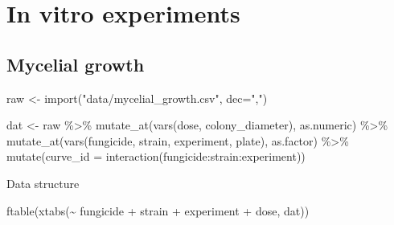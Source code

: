 \documentclass[
  letterpaper,
  DIV=11,
  numbers=noendperiod]{scrreport}
\newenvironment{Shaded}{\begin{snugshade}}{\end{snugshade}}
\newcommand{\AttributeTok}[1]{\textcolor[rgb]{0.40,0.45,0.13}{#1}}
\newcommand{\FunctionTok}[1]{\textcolor[rgb]{0.28,0.35,0.67}{#1}}
\newcommand{\NormalTok}[1]{\textcolor[rgb]{0.00,0.23,0.31}{#1}}
\newcommand{\OtherTok}[1]{\textcolor[rgb]{0.00,0.23,0.31}{#1}}
\newcommand{\SpecialCharTok}[1]{\textcolor[rgb]{0.37,0.37,0.37}{#1}}
\newcommand{\StringTok}[1]{\textcolor[rgb]{0.13,0.47,0.30}{#1}}
\begin{document}

\hypertarget{in-vitro-experiments}{%
\chapter{In vitro experiments}\label{in-vitro-experiments}}

\hypertarget{mycelial-growth}{%
\section{Mycelial growth}\label{mycelial-growth}}

\begin{Shaded}
\begin{Highlighting}[]
\NormalTok{raw }\OtherTok{\textless{}{-}} \FunctionTok{import}\NormalTok{(}\StringTok{"data/mycelial\_growth.csv"}\NormalTok{, }\AttributeTok{dec=}\StringTok{","}\NormalTok{)}

\NormalTok{dat }\OtherTok{\textless{}{-}}\NormalTok{ raw }\SpecialCharTok{\%\textgreater{}\%} 
  \FunctionTok{mutate\_at}\NormalTok{(}\FunctionTok{vars}\NormalTok{(dose, colony\_diameter), as.numeric) }\SpecialCharTok{\%\textgreater{}\%} 
  \FunctionTok{mutate\_at}\NormalTok{(}\FunctionTok{vars}\NormalTok{(fungicide, strain, experiment, plate), as.factor) }\SpecialCharTok{\%\textgreater{}\%} 
  \FunctionTok{mutate}\NormalTok{(}\AttributeTok{curve\_id =} \FunctionTok{interaction}\NormalTok{(fungicide}\SpecialCharTok{:}\NormalTok{strain}\SpecialCharTok{:}\NormalTok{experiment)) }
\end{Highlighting}
\end{Shaded}

Data structure

\begin{Shaded}
\begin{Highlighting}[]
\FunctionTok{ftable}\NormalTok{(}\FunctionTok{xtabs}\NormalTok{(}\SpecialCharTok{\textasciitilde{}}\NormalTok{ fungicide }\SpecialCharTok{+}\NormalTok{ strain }\SpecialCharTok{+}\NormalTok{ experiment }\SpecialCharTok{+}\NormalTok{ dose, dat))}
\end{Highlighting}
\end{Shaded}
\end{document}
